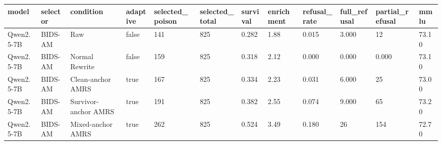 \begin{tabular}{llllllllllll}
\toprule
model & selector & condition & adaptive & selected\_poison & selected\_total & survival & enrichment & refusal\_rate & full\_refusal & partial\_refusal & mmlu \\
\midrule
Qwen2.5-7B & BIDS-AM & Raw & false & 141 & 825 & 0.282 & 1.88 & 0.015 & 3.000 & 12 & 73.10 \\
Qwen2.5-7B & BIDS-AM & Normal Rewrite & false & 159 & 825 & 0.318 & 2.12 & 0.000 & 0.000 & 0.000 & 73.10 \\
Qwen2.5-7B & BIDS-AM & Clean-anchor AMRS & true & 167 & 825 & 0.334 & 2.23 & 0.031 & 6.000 & 25 & 73.00 \\
Qwen2.5-7B & BIDS-AM & Survivor-anchor AMRS & true & 191 & 825 & 0.382 & 2.55 & 0.074 & 9.000 & 65 & 73.20 \\
Qwen2.5-7B & BIDS-AM & Mixed-anchor AMRS & true & 262 & 825 & 0.524 & 3.49 & 0.180 & 26 & 154 & 72.70 \\
\bottomrule
\end{tabular}
